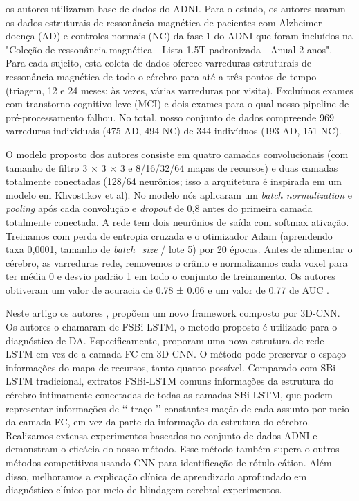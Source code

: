 \documentclass[openright]{UFRGS} %
\begin{document}
 
\cite{rieke2018visualizing}  os autores utilizaram base de dados do ADNI. Para o estudo, os autores usaram os dados estruturais de ressonância magnética de pacientes com Alzheimer doença (AD) e controles normais (NC) da fase 1 do ADNI que foram incluídos
na "Coleção de ressonância magnética - Lista 1.5T padronizada - Anual 2 anos". Para cada
sujeito, esta coleta de dados oferece varreduras estruturais de ressonância magnética de todo o cérebro para até a três pontos de tempo (triagem, 12 e 24 meses; às vezes, várias varreduras
por visita). Excluímos exames com transtorno cognitivo leve (MCI) e dois exames
para o qual nosso pipeline de pré-processamento falhou. No total, nosso conjunto de dados compreende 969
varreduras individuais (475 AD, 494 NC) de 344 indivíduos (193 AD, 151 NC).
  
O  modelo proposto dos autores consiste em quatro camadas convolucionais (com tamanho de filtro 3 × 3 × 3 e
8/16/32/64 mapas de recursos) e duas camadas totalmente conectadas (128/64 neurônios; isso
a arquitetura é inspirada em um modelo em Khvostikov et al). No modelo nós aplicaram um \textit{batch normalization}  e \textit{pooling} após cada convolução e \textit{dropout} de 0,8 antes do
primeira camada totalmente conectada. A rede tem dois neurônios de saída com softmax
ativação. Treinamos com perda de entropia cruzada e o otimizador Adam (aprendendo
taxa 0,0001, tamanho de \textit{batch\_size }/ lote 5) por 20 épocas. Antes de alimentar o cérebro, as varreduras
rede, removemos o crânio e normalizamos cada voxel para ter média 0 e
desvio padrão 1 em todo o conjunto de treinamento. Os autores obtiveram um valor de acuracia de
0.78 ± 0.06 e um valor de  0.77 de AUC \cite{rieke2018visualizing}. 

 Neste artigo os autores \cite{feng2019deep}, propõem um novo framework composto por 3D-CNN. Os autores o chamaram de
FSBi-LSTM, o metodo proposto  é utilizado para o diagnóstico de DA. Especificamente,
proporam uma nova estrutura de rede LSTM em vez de
a camada FC em 3D-CNN. O método pode preservar o espaço
informações do mapa de recursos, tanto quanto possível. Comparado
com SBi-LSTM tradicional, extratos FSBi-LSTM comuns
informações da estrutura do cérebro intimamente conectadas de todas as
camadas SBi-LSTM, que podem representar informações de ‘‘ traço ’’ constantes
mação de cada assunto por meio da camada FC, em vez da parte
da informação da estrutura do cérebro. Realizamos extensa
experimentos baseados no conjunto de dados ADNI e demonstram o
eficácia do nosso método. Esse método também supera o
outros métodos competitivos usando CNN para identificação de rótulo
cátion. Além disso, melhoramos a explicação clínica de
aprendizado aprofundado em diagnóstico clínico por meio de blindagem cerebral
experimentos.
\end{document}
